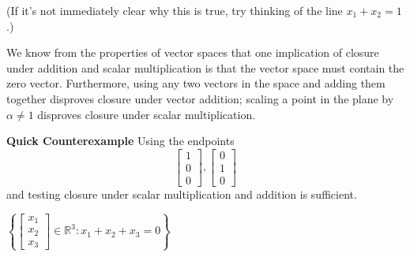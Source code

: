 \begin{enumerate}
{    (If it's not immediately clear why this is true, try thinking of the line $x_1 + x_2 = 1$.)

    We know from the properties of vector spaces that one implication of closure under addition and scalar multiplication is that the vector space must contain the zero vector. Furthermore, using any two vectors in the space and adding them together disproves closure under vector addition; scaling a point in the plane by $\alpha \neq 1$ disproves closure under scalar multiplication.

    \textbf{Quick Counterexample}
    Using the endpoints $$\begin{bmatrix}1\\0\\0\end{bmatrix}, \begin{bmatrix}0\\1\\0\end{bmatrix}$$ and testing closure under scalar multiplication and addition is sufficient.
}

\qitem\label{ques:notAffine}{
    $\left\{\begin{bmatrix}x_1\\x_2\\x_3\end{bmatrix} \in \mathbb{R}^3 : x_1 + x_2 + x_3 = 0\right\}$
}


\end{enumerate}
